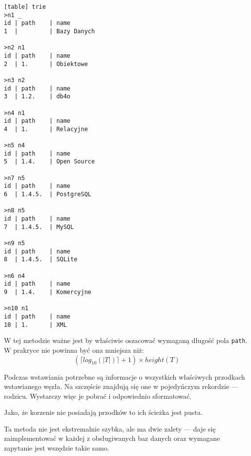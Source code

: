 \begin{verbatim}[table] trie
>n1 _
id | path    | name
1  |         | Bazy Danych

>n2 n1
id | path    | name
2  | 1.      | Obiektowe

>n3 n2
id | path    | name
3  | 1.2.    | db4o

>n4 n1
id | path    | name
4  | 1.      | Relacyjne

>n5 n4
id | path    | name
5  | 1.4.    | Open Source

>n7 n5
id | path    | name
6  | 1.4.5.  | PostgreSQL

>n8 n5
id | path    | name
7  | 1.4.5.  | MySQL

>n9 n5
id | path    | name
8  | 1.4.5.  | SQLite

>n6 n4
id | path    | name
9  | 1.4.    | Komercyjne

>n10 n1
id | path    | name
10 | 1.      | XML

\end{verbatim}



W tej metodzie ważne jest by właściwie oszacować wymaganą długość pola \texttt{path}.
W prakryce nie powinna być ona mniejsza niż:
\begin{displaymath}
    (\lceil log_{10}(|T|) \rceil + 1) \times height(T)
\end{displaymath}




Podczas wstawiania potrzebne są informacje o wszystkich właściwych przodkach wstawianego węzła.
Na szczęście znajdują się one w pojedyńczym rekordzie --- rodzicu.
Wystarczy więc je pobrać i odpowiednio sformatować.



Jako, że korzenie nie posiadają przodków to ich ścieżka jest pusta. 





Ta metoda nie jest ekstremalnie szybka, ale ma dwie zalety ---
daje się zaimplementować w każdej z obsługiwanych baz danych oraz wymagane zapytanie jest wszędzie takie samo.



